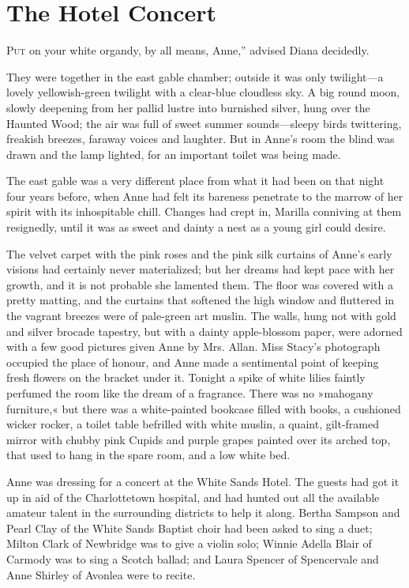 \chapter{The Hotel Concert}

\lettrine[ante=“,lines=4]{P}{ut} on your white organdy, by all means, Anne,” advised Diana decidedly.

They were together in the east gable chamber; outside it was only twilight—a lovely yellowish-green twilight with a clear-blue cloudless sky. A big round moon, slowly deepening from her pallid lustre into burnished silver, hung over the Haunted Wood; the air was full of sweet summer sounds—sleepy birds twittering, freakish breezes, faraway voices and laughter. But in Anne’s room the blind was drawn and the lamp lighted, for an important toilet was being made.

The east gable was a very different place from what it had been on that night four years before, when Anne had felt its bareness penetrate to the marrow of her spirit with its inhospitable chill. Changes had crept in, Marilla conniving at them resignedly, until it was as sweet and dainty a nest as a young girl could desire.

The velvet carpet with the pink roses and the pink silk curtains of Anne’s early visions had certainly never materialized; but her dreams had kept pace with her growth, and it is not probable she lamented them. The floor was covered with a pretty matting, and the curtains that softened the high window and fluttered in the vagrant breezes were of pale-green art muslin. The walls, hung not with gold and silver brocade tapestry, but with a dainty apple-blossom paper, were adorned with a few good pictures given Anne by Mrs. Allan. Miss Stacy’s photograph occupied the place of honour, and Anne made a sentimental point of keeping fresh flowers on the bracket under it. Tonight a spike of white lilies faintly perfumed the room like the dream of a fragrance. There was no »mahogany furniture,« but there was a white-painted bookcase filled with books, a cushioned wicker rocker, a toilet table befrilled with white muslin, a quaint, gilt-framed mirror with chubby pink Cupids and purple grapes painted over its arched top, that used to hang in the spare room, and a low white bed.

Anne was dressing for a concert at the White Sands Hotel. The guests had got it up in aid of the Charlottetown hospital, and had hunted out all the available amateur talent in the surrounding districts to help it along. Bertha Sampson and Pearl Clay of the White Sands Baptist choir had been asked to sing a duet; Milton Clark of Newbridge was to give a violin solo; Winnie Adella Blair of Carmody was to sing a Scotch ballad; and Laura Spencer of Spencervale and Anne Shirley of Avonlea were to recite.

